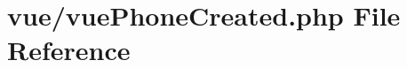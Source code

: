 \hypertarget{vue_phone_created_8php}{}\section{vue/vue\+Phone\+Created.php File Reference}
\label{vue_phone_created_8php}
